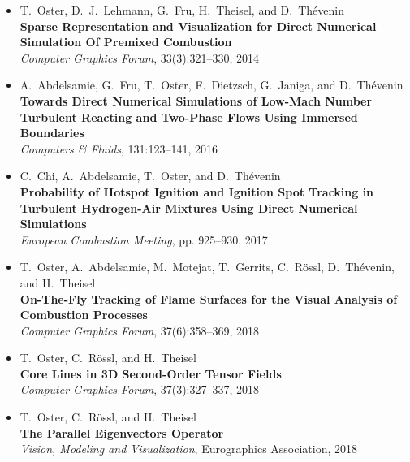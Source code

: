 %
\begin{itemize}[label={},leftmargin=0pt]
    \item T.~Oster, D.~J.~Lehmann, G.~Fru, H.~Theisel, and D.~Thévenin\\
        \textbf{Sparse Representation and Visualization for Direct Numerical Simulation Of
        Premixed Combustion}\\
        {\small \emph{Computer Graphics Forum}, 33(3):321--330, 2014}

    \item A.~Abdelsamie, G.~Fru, T.~Oster, F.~Dietzsch, G.~Janiga, and D.~Thévenin\\
        \textbf{Towards Direct Numerical Simulations of Low-Mach Number Turbulent Reacting
        and Two-Phase Flows Using Immersed Boundaries}\\
        {\small \emph{Computers \& Fluids}, 131:123--141, 2016}

    \item C.~Chi, A.~Abdelsamie, T.~Oster, and D.~Thévenin\\
        \textbf{Probability of Hotspot Ignition and Ignition Spot Tracking in
        Turbulent Hydrogen-Air Mixtures Using Direct Numerical Simulations}\\
        {\small \emph{ European Combustion Meeting}, pp. 925--930, 2017}

    \item T.~Oster, A.~Abdelsamie, M.~Motejat, T.~Gerrits, C.~Rössl, D.~Thévenin, and H.~Theisel\\
        \textbf{On-The-Fly Tracking of Flame Surfaces for the Visual Analysis
        of Combustion Processes}\\
        {\small \emph{Computer Graphics Forum}, 37(6):358--369, 2018}

    \item T.~Oster, C.~Rössl, and H.~Theisel\\
        \textbf{Core Lines in \ac{3D} Second-Order Tensor Fields}\\
        {\small \emph{Computer Graphics Forum}, 37(3):327--337, 2018}

    \item T.~Oster, C.~Rössl, and H.~Theisel\\
        \textbf{The Parallel Eigenvectors Operator}\\
        {\small \emph{Vision, Modeling and Visualization}, Eurographics Association, 2018}
\end{itemize}

%
